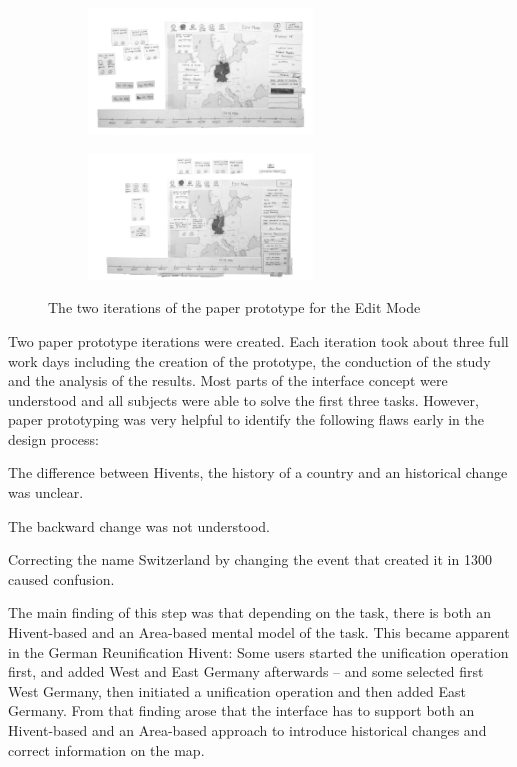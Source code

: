 \begin{figure}[H]
\centering
\begin{subfigure}{.5\textwidth}
  \centering
  \includegraphics[width=225px]{graphics/development/user_interface_design_process/paper_prototype_1.png}
\end{subfigure}%
\begin{subfigure}{.5\textwidth}
  \centering
  \includegraphics[width=225px]{graphics/development/user_interface_design_process/paper_prototype_2.png}
\end{subfigure}
\caption{The two iterations of the paper prototype for the Edit Mode}
\label{fig:paper_prototypes}
\end{figure}

Two paper prototype iterations were created. Each iteration took about three full work days including the creation of the prototype, the conduction of the study and the analysis of the results.
Most parts of the interface concept were understood and all subjects were able to solve the first three tasks. However, paper prototyping was very helpful to identify the following flaws early in the design process:

\begin{compactenum}
  \item The difference between Hivents, the history of a country and an historical change was unclear.
  \item The backward change was not understood.
  \item Correcting the name Switzerland by changing the event that created it in 1300 caused confusion.
\end{compactenum}

The main finding of this step was that depending on the task, there is both an Hivent-based and an Area-based mental model of the task. This became apparent in the German Reunification Hivent: Some users started the unification operation first, and added West and East Germany afterwards -- and some selected first West Germany, then initiated a unification operation and then added East Germany. From that finding arose that the interface has to support both an Hivent-based and an Area-based approach to introduce historical changes and correct information on the map.

